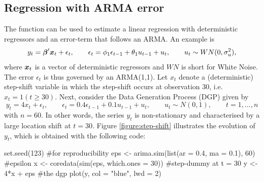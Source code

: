 \subsection{Regression with ARMA error}

The function  can be used to estimate a linear regression with deterministic regressors and an error-term that follows an ARMA. An example is
%
\begin{equation*}
	y_t = \boldsymbol{\beta}'\boldsymbol{x}_{t} + \epsilon_t, \qquad \epsilon_t = \phi_1\epsilon_{t-1} + \theta_1 u_{t-1} + u_t, \qquad u_t\sim WN(0,\sigma_u^2),
\end{equation*} 
%
where $\boldsymbol{x}_t$ is a vector of deterministic regressors and $WN$ is short for White Noise. The error $\epsilon_t$ is thus governed by an ARMA(1,1). Let $x_t$ denote a (deterministic) step-shift variable in which the step-shift occurs at observation 30, i.e.\ $x_t = 1(t\geq30)$. Next, consider the Data Generation Process (DGP) given by
%
\begin{equation*}
	y_t = 4x_t + \epsilon_t, \qquad \epsilon_t = 0.4\epsilon_{t-1} + 0.1 u_{t-1} + u_t, \qquad u_t \sim N(0,1), \qquad t=1,\ldots,n
\end{equation*}
%
with $n=60$. In other words, the series $y_t$ is non-stationary and characterised by a large location shift at $t=30$. Figure \ref{figure:step-shift} illustrates the evolution of $y_t$, which is obtained with the following code:
%
\begin{example}
  set.seed(123) #for reproducibility
  eps <- arima.sim(list(ar = 0.4, ma = 0.1), 60) #epsilon
  x <- coredata(sim(eps, which.ones = 30)) #step-dummy at t = 30
  y <- 4*x + eps #the dgp
  plot(y, col = "blue", lwd = 2)
\end{example}
%
